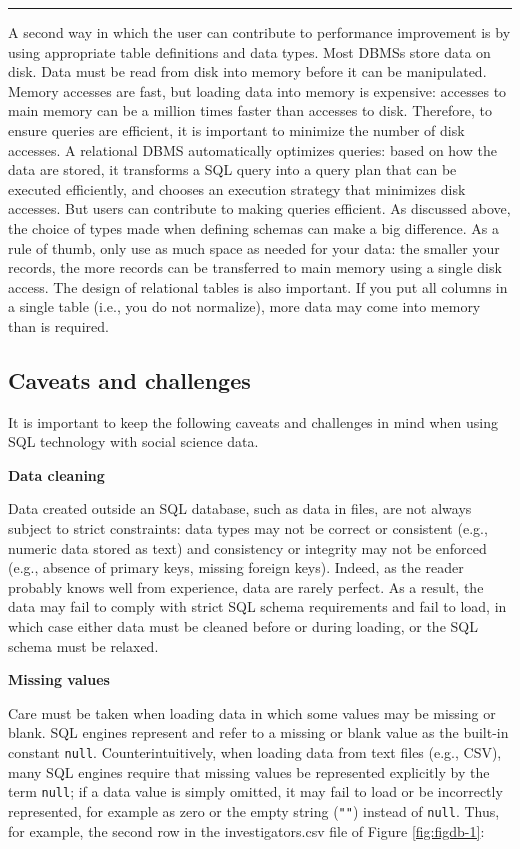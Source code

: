 \documentclass[]{krantz}
\begin{document}
\begin{center}\rule{0.5\linewidth}{\linethickness}\end{center}

A second way in which the user can contribute to performance improvement
is by using appropriate table definitions and data types. Most DBMSs
store data on disk. Data must be read from disk into memory before it
can be manipulated. Memory accesses are fast, but loading data into
memory is expensive: accesses to main memory can be a million times
faster than accesses to disk. Therefore, to ensure queries are
efficient, it is important to minimize the number of disk accesses. A
relational DBMS automatically optimizes queries: based on how the data
are stored, it transforms a SQL query into a query plan that can be
executed efficiently, and chooses an execution strategy that minimizes
disk accesses. But users can contribute to making queries efficient. As
discussed above, the choice of types made when defining schemas can make
a big difference. As a rule of thumb, only use as much space as needed
for your data: the smaller your records, the more records can be
transferred to main memory using a single disk access. The design of
relational tables is also important. If you put all columns in a single
table (i.e., you do not normalize), more data may come into memory than
is required.

\subsection{Caveats and challenges}\label{caveats-and-challenges}

It is important to keep the following caveats and challenges in mind
when using SQL technology with social science data.

\textbf{Data cleaning}

Data created outside an SQL database, such as data in files, are not
always subject to strict constraints: data types may not be correct or
consistent (e.g., numeric data stored as text) and consistency or
integrity may not be enforced (e.g., absence of primary keys, missing
foreign keys). Indeed, as the reader probably knows well from
experience, data are rarely perfect. As a result, the data may fail to
comply with strict SQL schema requirements and fail to load, in which
case either data must be cleaned before or during loading, or the SQL
schema must be relaxed.

\textbf{Missing values}

Care must be taken when loading data in which some values may be missing
or blank. SQL engines represent and refer to a missing or blank value as
the built-in constant \texttt{null}. Counterintuitively, when loading
data from text files (e.g., CSV), many SQL engines require that missing
values be represented explicitly by the term \texttt{null}; if a data
value is simply omitted, it may fail to load or be incorrectly
represented, for example as zero or the empty string (\texttt{""})
instead of \texttt{null}. Thus, for example, the second row in the
investigators.csv file of Figure \ref{fig:figdb-1}:
\end{document}
